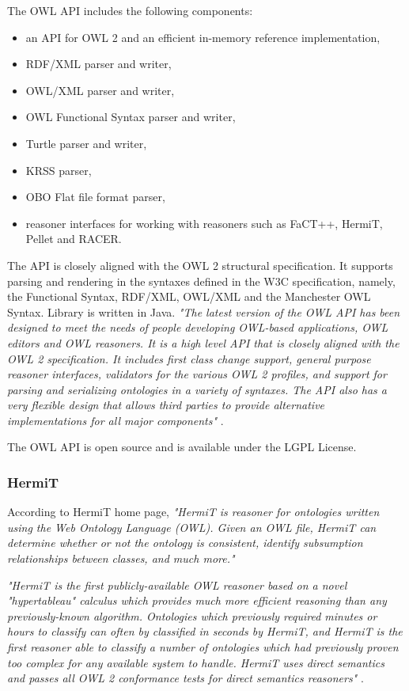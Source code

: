 \noindent The OWL API includes the following components:
\begin{itemize}
    \setlength{\itemsep}{0cm}
    \setlength{\parskip}{0cm}

    \item an API for OWL 2 and an efficient in-memory reference implementation,
    \item RDF/XML parser and writer,
    \item OWL/XML parser and writer,
    \item OWL Functional Syntax parser and writer,
    \item Turtle parser and writer,
    \item KRSS parser,
    \item OBO Flat file format parser,
    \item reasoner interfaces for working with reasoners such as FaCT++, HermiT, Pellet and RACER.
\end{itemize}

\noindent The API is closely aligned with the OWL 2 structural specification. It supports parsing and rendering in the syntaxes defined in the W3C specification, namely, the Functional Syntax, RDF/XML, OWL/XML and the Manchester OWL Syntax. Library is written in Java. \textit{"The latest version of the OWL API has been designed to meet the needs of people developing OWL-based applications, OWL editors and OWL reasoners. It is a high level API that is closely aligned with the OWL 2 specification. It includes first class change support, general purpose reasoner interfaces, validators for the various OWL 2 profiles, and support for parsing and serializing ontologies in a variety of syntaxes. The API also has a very flexible design that allows third parties to provide alternative implementations for all major components"} \cite{Hor09}.

The OWL API is open source and is available under the LGPL License.

\subsubsection{HermiT}
\label{sss:hermiT}

According to HermiT home page, \textit{"HermiT is reasoner for ontologies written using the Web Ontology Language (OWL). Given an OWL file, HermiT can determine whether or not the ontology is consistent, identify subsumption relationships between classes, and much more."}

\textit{"HermiT is the first publicly-available OWL reasoner based on a novel "hypertableau" calculus which provides much more efficient reasoning than any previously-known algorithm. Ontologies which previously required minutes or hours to classify can often by classified in seconds by HermiT, and HermiT is the first reasoner able to classify a number of ontologies which had previously proven too complex for any available system to handle. HermiT uses direct semantics and passes all OWL 2 conformance tests for direct semantics reasoners"} \cite{HermiTHome}.

